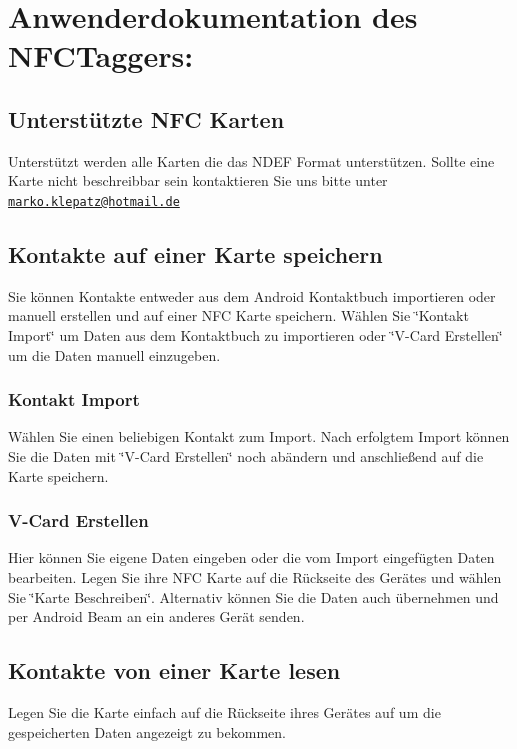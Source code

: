 \documentclass[a4paper,ngerman,12pt]{scrreprt}
\begin{document}
\chapter{Anwenderdokumentation des NFCTaggers:}
\section{Unterstützte NFC Karten}

Unterstützt werden alle Karten die das NDEF Format unterstützen. Sollte eine Karte nicht beschreibbar sein kontaktieren Sie uns bitte unter \href{mailto:marko.klepatz@hotmail.de}{\tt marko.klepatz@hotmail.de}

\section{Kontakte auf einer Karte speichern}

Sie können Kontakte entweder aus dem Android Kontaktbuch importieren oder manuell erstellen und auf einer NFC Karte speichern. Wählen Sie \char`\"{}Kontakt Import\char`\"{} um Daten aus dem Kontaktbuch zu importieren oder \char`\"{}V-Card Erstellen\char`\"{} um die Daten manuell einzugeben.

\subsection{Kontakt Import}

Wählen Sie einen beliebigen Kontakt zum Import. Nach erfolgtem Import können Sie die Daten mit \char`\"{}V-Card Erstellen\char`\"{} noch abändern und anschließend auf die Karte speichern.

\subsection{V-Card Erstellen}

Hier können Sie eigene Daten eingeben oder die vom Import eingefügten Daten bearbeiten. Legen Sie ihre NFC Karte auf die Rückseite des Gerätes und wählen Sie \char`\"{}Karte Beschreiben\char`\"{}. Alternativ können Sie die Daten auch übernehmen und per Android Beam an ein anderes Gerät senden.

\section{Kontakte von einer Karte lesen}

Legen Sie die Karte einfach auf die Rückseite ihres Gerätes auf um die gespeicherten Daten angezeigt zu bekommen. 
\end{document}
